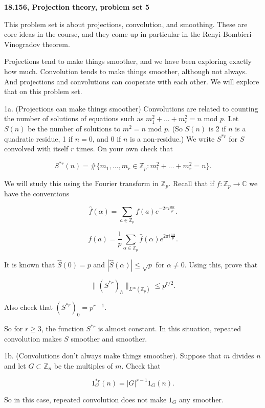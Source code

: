 \documentclass{amsart}
\newcommand{\CC}{\mathbb{C}}
\newcommand{\ZZ}{\mathbb{Z}}
\begin{document}
{\bf  18.156, Projection theory,  problem set 5}

\vskip10pt

This problem set is about projections,  convolution,  and smoothing.   These are core ideas in the course,  and they come up in particular in the Renyi-Bombieri-Vinogradov theorem.

Projections tend to make things smoother,  and we have been exploring exactly how much.   Convolution tends to make things smoother,  although not always.   And projections and convolutions can cooperate with each other.  We will explore that on this problem set.

\vskip10pt

1a.  (Projections can make things smoother)   Convolutions are related to counting the number of solutions of equations such as $m_1^2 + ... + m_r^2 = n$ mod $p$.   Let $S(n)$ be the number of solutions to $m^2 = n$ mod $p$.  (So $S(n)$ is 2 if $n$ is a quadratic residue,  1 if $n = 0$,  and 0 if $n$ is a non-residue.)   We write $S^{*r}$ for $S$ convolved with itself $r$ times.   On your own check that

$$ S^{*r}(n) = \# \{ m_1, ..., m_r \in \ZZ_p : m_1^2 + ... + m_r^2 = n \}. $$

We will study this using the Fourier transform in $\ZZ_p$.   Recall that if $f: \ZZ_p \rightarrow \CC$ we have the conventions

$$ \hat f(\alpha) = \sum_{a \in \ZZ_p} f(a) e^{- 2 \pi i \frac{a \alpha}{p}}. $$

$$ f(a) = \frac{1}{p} \sum_{\alpha \in \ZZ_p} \hat f(\alpha) e^{ 2 \pi i \frac{a \alpha}{p}}. $$

It is known that $\hat S(0) = p$ and $|\hat S(\alpha)| \le \sqrt{p}$ for $\alpha \not= 0$.   Using this,  prove that

$$ \|  (S^{*r})_h \|_{L^\infty(\ZZ_p)} \le p^{r/2}.  $$

Also check that $  (S^{*r})_0 = p^{r-1}$.   

So for $r \ge 3$,  the function $S^{*r}$ is almost constant.    In this situation,  repeated convolution makes $S$ smoother and smoother.

\vskip10pt

1b.  (Convolutions don't always make things smoother).   Suppose that $m$ divides $n$ and let $G \subset \ZZ_n$ be the multiples of $m$.   Check that

$$ 1_G^{*r} (n) = |G|^{r-1} 1_G(n). $$

So in this case,  repeated convolution does not make $1_G$ any smoother.
\end{document}
